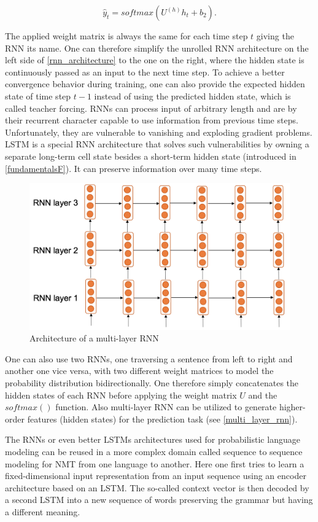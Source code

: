 \begin{equation}
	\hat{y}_t = softmax(U^{(h)} h_t + b_2).
\end{equation}

The applied weight matrix is always the same for each time step $t$ giving the \ac{RNN} its name. One can therefore simplify the unrolled \ac{RNN} architecture on the left side of \autoref{rnn_architecture} to the one on the right, where the hidden state is continuously passed as an input to the next time step. To achieve a better convergence behavior during training, one can also provide the expected hidden state of time step $t-1$ instead of using the predicted hidden state, which is called teacher forcing. \acp{RNN} can process input of arbitrary length and are by their recurrent character capable to use information from previous time steps. Unfortunately, they are vulnerable to vanishing and exploding gradient problems. \ac{LSTM} is a special \ac{RNN} architecture that solves such vulnerabilities by owning a separate long-term cell state besides a short-term hidden state (introduced in \autoref{fundamentalsF}). It can preserve information over many time steps. \cite{Gertz2020}

\begin{figure}[ht]
	\centering
	\includegraphics[width=0.6\linewidth]{figures/multi_layer_rnn.png}
	\caption{Architecture of a multi-layer  \ac{RNN} \cite[p. 87]{Gertz2020}}
	\label{multi_layer_rnn}
\end{figure}

One can also use two \acp{RNN}, one traversing a sentence from left to right and another one vice versa, with two different weight matrices to model the probability distribution bidirectionally. One therefore simply concatenates the hidden states of each \ac{RNN} before applying the weight matrix $U$ and the $softmax()$ function. Also multi-layer \acs{RNN} can be utilized to generate higher-order features (hidden states) for the prediction task (see \autoref{multi_layer_rnn}). \cite{Gertz2020}

The \acp{RNN} or even better \acp{LSTM} architectures used for probabilistic language modeling can be reused in a more complex domain called sequence to sequence modeling for \ac{NMT} from one lan\-gua\-ge to another. Here one first tries to learn a fixed-dimensional input re\-pre\-sen\-ta\-ti\-on from an input sequence using an encoder architecture based on an \ac{LSTM}. The so-called context vector is then decoded by a second \ac{LSTM} into a new sequence of words preserving the grammar but having a different meaning. \cite{Sutskever2014}

